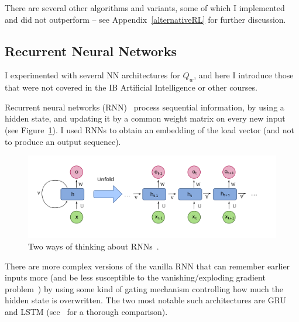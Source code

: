 There are several other algorithms and variants, some of which I implemented and did not outperform \DQL -- see Appendix~\ref{alternativeRL} for further discussion.


\subsection{Recurrent Neural Networks} \label{RNN}


I experimented with several NN architectures for $Q_w$, and here I introduce those that were not covered in the IB Artificial Intelligence or other courses.

Recurrent neural networks (RNN)~\cite{hopfield1982RNNoriginal} process sequential information, by using a hidden state, and updating it by a common weight matrix on every new input (see Figure~\ref{RNN-image}). I used RNNs to obtain an embedding of the load vector (and not to produce an output sequence).

\begin{figure}[h]
    \centering
    \includegraphics[scale=0.2]{Chapter2/Figs/RNN.png}
    \caption{Two ways of thinking about RNNs~\cite{RNN}.}
     \label{RNN-image}
\end{figure}

There are more complex versions of the vanilla RNN that can remember earlier inputs more (and be less susceptible to the vanishing/exploding gradient problem~\cite{noh2021rnnvanishinggradient}) by using some kind of gating mechanism controlling how much the hidden state is overwritten. The two most notable such architectures are GRU and LSTM (see~\cite{shewalkar2019rnngrulstm} for a thorough comparison).


